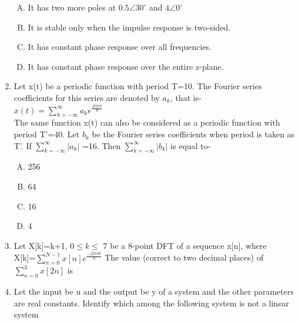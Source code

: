 \documentclass[journal,12pt,twocolumn]{IEEEtran}
\begin{document}
\begin{enumerate}
\begin{enumerate}[(A)]
\setlength\itemsep{0.5em}

\item  It has two more poles at $ 0.5\angle 30^\circ$ and $4\angle 0^\circ  $
\item  It is stable only when the impulse response is two-sided.

\item  It has constant phase response over all frequencies.

\item It has constant phase response over the entire
z-plane.

\end{enumerate}

\item Let x(t) be a periodic function with period T=10. The Fourier series coefficients for this series are denoted by $a_k$, that is-\\
$x(t)=\sum _{k=-\infty }^{\infty }a_k e^{\frac{jk2\pi t}{T}}$ \\
The same function x(t) can also be considered as a periodic function with period T'=40. Let $b_k$ be the Fourier series coefficients when period is taken as T'. If $\sum _{k=-\infty }^{\infty } |a_k|$ =16. Then $\sum _{k=-\infty }^{\infty } |b_k|$ is equal to-
\begin{enumerate}[(A)]

\setlength\itemsep{0.5em}

\item 256
\item 64

\item 16

\item 4

\end{enumerate}

\item Let X[k]=k+1, $0 \leq k \leq$ 7 be a 8-point DFT of a sequence x[n],
where \\ X[k]=$\sum _{n=0 }^{N-1 } x[n] e^{\frac{-j2\pi nk}{N}}$
The value (correct to two decimal places) of $\sum _{n=0 }^{3 } x[2n]$ is  \underline{\hspace{2cm}}

\item Let the input be u and the output be y of a system and the other parameters are real constants. Identify which among the following system is not a linear system
\begin{enumerate}[(A)]

\setlength\itemsep{0.5em}


\end{enumerate}
\end{enumerate}
\end{document}
